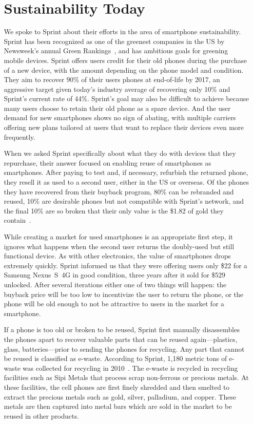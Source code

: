 \section{Sustainability Today}
\label{sec-sustainability}

We spoke to Sprint about their efforts in the area of smartphone
sustainability. Sprint has been recognized as one of the greenest companies
in the US by Newsweek's annual Green Rankings~\cite{sprintgreen-url}, and has
ambitious goals for greening mobile devices. Sprint offers users credit for
their old phones during the purchase of a new device, with the amount
depending on the phone model and condition. They aim to recover 90\% of their
users phones at end-of-life by 2017, an aggressive target given today's
industry average of recovering only 10\% and Sprint's current rate of 44\%.
Sprint's goal may also be difficult to achieve because many users choose to
retain their old phone as a spare device. And the user demand for new
smartphones shows no sign of abating, with multiple carriers offering new
plans tailored at users that want to replace their devices even more
frequently.

When we asked Sprint specifically about what they do with devices that they
repurchase, their answer focused on enabling reuse of smartphones as
smartphones. After paying to test and, if necessary, refurbish the returned
phone, they resell it as used to a second user, either in the US or overseas.
Of the phones they have recovered from their buyback program, 80\% can be
rebranded and reused, 10\% are desirable phones but not compatible with
Sprint's network, and the final 10\% are so broken that their only value is
the \$1.82 of gold they contain~\cite{cnn-goldinphone}.

While creating a market for used smartphones is an appropriate first step, it
ignores what happens when the second user returns the doubly-used but still
functional device. As with other electronics, the value of smartphones drops
extremely quickly. Sprint informed us that they were offering users only \$22
for a Samsung Nexus~S~4G in good condition, three years after it sold for
\$529 unlocked. After several iterations either one of two things will
happen: the buyback price will be too low to incentivize the user to return
the phone, or the phone will be old enough to not be attractive to users in
the market for a smartphone.

If a phone is too old or broken to be reused, Sprint first manually
disassembles the phones apart to recover valuable parts that can be reused
again---plastics, glass, batteries---prior to sending the phones for
recycling. Any part that cannot be reused is classified as e-waste. According
to Sprint, 1,180 metric tons of e-waste was collected for recycling in
2010~\cite{sprintpolicy-url}. The e-waste is recycled in recycling facilities
such as Sipi Metals that process scrap non-ferrous or precious metals. At
these facilities, the cell phones are first finely shredded and then smelted
to extract the precious metals such as gold, silver, palladium, and copper.
These metals are then captured into metal bars which are sold in the market
to be reused in other products.


